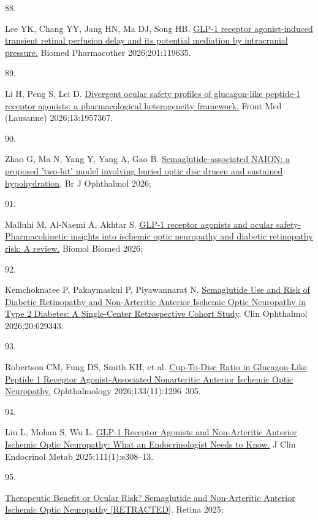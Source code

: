 \documentclass[
  11pt,
]{article}
\newlength{\cslhangindent}
\newlength{\csllabelwidth}
\newenvironment{CSLReferences}[2] %
 {\begin{list}{}{%
  \setlength{\itemindent}{0pt}
  \setlength{\leftmargin}{0pt}
  \setlength{\parsep}{0pt}
  \ifodd #1
   \setlength{\leftmargin}{\cslhangindent}
   \setlength{\itemindent}{-1\cslhangindent}
  \fi
  \setlength{\itemsep}{#2\baselineskip}}}
 {\end{list}}
\newcommand{\CSLLeftMargin}[1]{\parbox[t]{\csllabelwidth}{\strut#1\strut}}
\newcommand{\CSLRightInline}[1]{\parbox[t]{\linewidth - \csllabelwidth}{\strut#1\strut}}
\begin{document}
\begin{CSLReferences}{0}{1}
\CSLLeftMargin{88. }%
\CSLRightInline{Lee YK, Chang YY, Jang HN, Ma DJ, Song HB.
\href{https://doi.org/10.1016/j.biopha.2026.119635}{{GLP-1 receptor
agonist-induced transient retinal perfusion delay and its potential
mediation by intracranial pressure.}} Biomed Pharmacother
2026;201:119635. }

\CSLLeftMargin{89. }%
\CSLRightInline{Li H, Peng S, Lei D.
\href{https://doi.org/10.3389/fmed.2026.1957367}{{Divergent ocular
safety profiles of glucagon-like peptide-1 receptor agonists: a
pharmacological heterogeneity framework.}} Front Med (Lausanne)
2026;13:1957367. }

\CSLLeftMargin{90. }%
\CSLRightInline{Zhao G, Ma N, Yang Y, Yang A, Gao B.
\href{https://doi.org/10.1136/bjo-2026-329598}{{Semaglutide-associated
NAION: a proposed 'two-hit' model involving buried optic disc drusen and
sustained hypohydration}}. Br J Ophthalmol 2026;}

\CSLLeftMargin{91. }%
\CSLRightInline{Malluhi M, Al-Naemi A, Akhtar S.
\href{https://doi.org/10.17305/bb.2026.14701}{{GLP-1 receptor agonists
and ocular safety- Pharmacokinetic insights into ischemic optic
neuropathy and diabetic retinopathy risk: A review.}} Biomol Biomed
2026;}

\CSLLeftMargin{92. }%
\CSLRightInline{Kemchoknatee P, Pakaymaskul P, Piyawannarat N.
\href{https://doi.org/10.2147/OPTH.S629343}{{Semaglutide Use and Risk of
Diabetic Retinopathy and Non-Arteritic Anterior Ischemic Optic
Neuropathy in Type 2 Diabetes: A Single-Center Retrospective Cohort
Study}}. Clin Ophthalmol 2026;20:629343. }

\CSLLeftMargin{93. }%
\CSLRightInline{Robertson CM, Fung DS, Smith KH, et al.
\href{https://doi.org/10.1016/j.ophtha.2026.07.036}{{Cup-To-Disc Ratio
in Glucagon-Like Peptide 1 Receptor Agonist-Associated Nonarteritic
Anterior Ischemic Optic Neuropathy.}} Ophthalmology
2026;133(11):1296--305. }

\CSLLeftMargin{94. }%
\CSLRightInline{Liu L, Mohan S, Wu L.
\href{https://doi.org/10.1210/clinem/dgaf541}{{GLP-1 Receptor Agonists
and Non-Arteritic Anterior Ischemic Optic Neuropathy: What an
Endocrinologist Needs to Know.}} J Clin Endocrinol Metab
2025;111(1):e308--13. }

\CSLLeftMargin{95. }%
\CSLRightInline{\href{https://doi.org/10.1097/IAE.0000000000004709}{{Therapeutic
Benefit or Ocular Risk? Semaglutide and Non-Arteritic Anterior Ischemic
Optic Neuropathy {[}RETRACTED{]}}}. Retina 2025;}


\end{CSLReferences}
\end{document}
